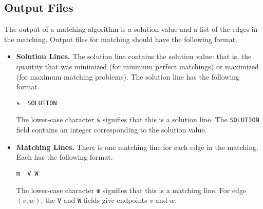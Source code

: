 \subsection{Output Files}
The output of a matching algorithm is a solution value and
a  list of the edges in the matching.  Output files for
matching should	 have the following format.
\begin{itemize} 

\item {\bf Solution Lines.}  The solution line 
contains the solution value:  that is, 
the quantity that was minimized (for minimum perfect 
matchings) or maximized (for maximum  matching problems). 
The solution line has the following format.
\begin{verbatim}
s  SOLUTION
\end{verbatim}
The lower-case character {\tt s} signifies that this is a solution 
line. The {\tt SOLUTION} field contains an integer corresponding
to the solution value.

\item {\bf Matching Lines.}  There is one matching line 
for each edge in the matching.  Each has the following format. 
\begin{verbatim}
m  V W 
\end{verbatim}  
The lower-case character {\tt m} signifies that this is a matching
line.  For edge $(v,w)$, the {\tt V} and {\tt W} fields give 
endpoints $v$ and $w$. 

\end{itemize} 


 

